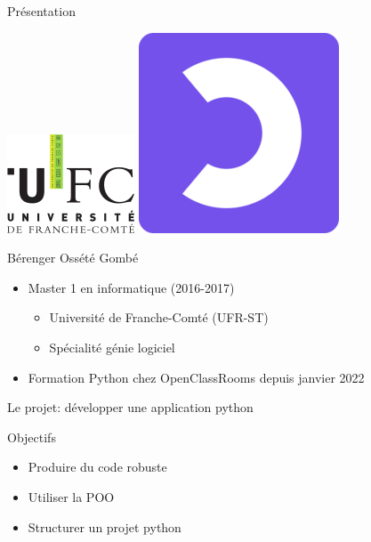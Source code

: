 \begin{frame}{Présentation}

  \begin{center}
    \includegraphics[scale=0.5]{img/logo_ufc.png}
    \hspace{1em}
    \includegraphics[scale=0.3]{img/logo_ocr.png}
  \end{center}
  
  \begin{block}{Bérenger Ossété Gombé}
    \begin{itemize}
    \item Master 1 en informatique (2016-2017)
      \begin{itemize}
      \item Université de Franche-Comté (UFR-ST)
      \item Spécialité génie logiciel
      \end{itemize}
    \item Formation Python chez OpenClassRooms depuis janvier 2022
    \end{itemize}    
  \end{block}
\end{frame}

\begin{frame}{Le projet: développer une application python}

  \begin{block}{Objectifs}
    \begin{itemize}
    \item Produire du code robuste
    \item Utiliser la POO
    \item Structurer un projet python
    \end{itemize}
  \end{block}
\end{frame}

